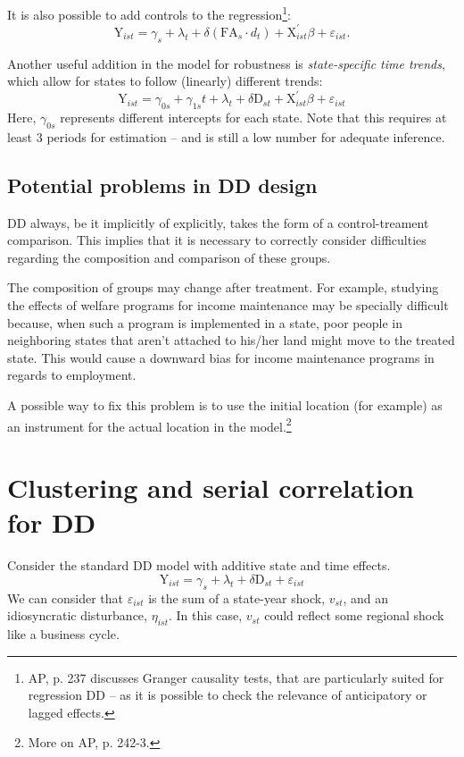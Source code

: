 \documentclass[11pt, a4paper]{report}
\theoremstyle{plain}
\theoremstyle{plain}
\theoremstyle{remark}
\begin{document}
It is also possible to add controls to the regression\footnote{AP, p. 237 discusses Granger causality tests, that are particularly suited for regression DD -- as it is possible to check the relevance of anticipatory or lagged effects.}:
\begin{equation}
    \mathrm{Y}_{i s t}=\gamma_{s}+\lambda_{t}+\delta\left(\mathrm{FA}_{s} \cdot d_{t}\right)+\mathrm{X}_{i s t}^{\prime} \beta+\varepsilon_{i s t}.
    \end{equation}

Another useful addition in the model for robustness is \textit{state-specific time trends}, which allow for states to follow (linearly) different trends:
\begin{equation}
    \mathrm{Y}_{i s t}=\gamma_{0 s}+\gamma_{1 s} t+\lambda_{t}+\delta \mathrm{D}_{s t}+\mathrm{X}_{i s t}^{\prime} \beta+\varepsilon_{i s t}
    \end{equation}
Here, $\gamma_{0s}$ represents different intercepts for each state. Note that this requires at least 3 periods for estimation -- and is still a low number for adequate inference. 

\subsection{Potential problems in DD design}

DD always, be it implicitly of explicitly, takes the form of a control-treament comparison. This implies that it is necessary to correctly consider difficulties regarding the composition and comparison of these groups.

The composition of groups may change after treatment. For example, studying the effects of welfare programs for income maintenance may be specially difficult because, when such a program is implemented in a state, poor people in neighboring states that aren't attached to his/her land might move to the treated state. This would  cause a downward bias for income maintenance programs in regards to employment. 

A possible way to fix this problem is to use the initial location (for example) as an instrument for the actual location in the model.\footnote{More on AP, p. 242-3.} 

\section{Clustering and serial correlation for DD}

Consider the standard DD model with additive state and time effects.
\begin{equation}
    \mathrm{Y}_{i s t}=\gamma_{s}+\lambda_{t}+\delta \mathrm{D}_{s t}+\varepsilon_{i s t}
    \end{equation}
We can consider that $\varepsilon_{ist}$ is the sum of a state-year shock, $v_{st}$, and an idiosyncratic disturbance, $\eta_{ist}$. In this case, $v_{st}$ could reflect some regional shock like a business cycle.
\end{document}
